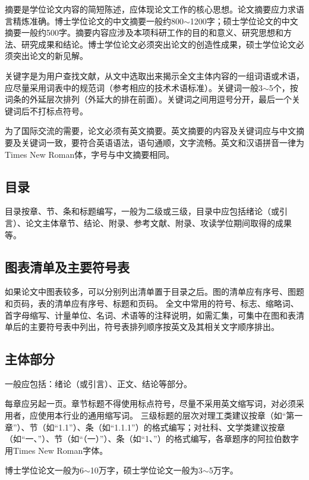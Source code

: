 摘要是学位论文内容的简短陈述，应体现论文工作的核心思想。论文摘要应力求语言精炼准确。博士学位论文的中文摘要一般约800$\sim$1200字；硕士学位论文的中文摘要一般约500字。摘要内容应涉及本项科研工作的目的和意义、研究思想和方法、研究成果和结论。博士学位论文必须突出论文的创造性成果，硕士学位论文必须突出论文的新见解。

关键字是为用户查找文献，从文中选取出来揭示全文主体内容的一组词语或术语，应尽量采用词表中的规范词（参考相应的技术术语标准）。关键词一般3$\sim$5个，按词条的外延层次排列（外延大的排在前面）。关键词之间用逗号分开，最后一个关键词后不打标点符号。

为了国际交流的需要，论文必须有英文摘要。英文摘要的内容及关键词应与中文摘要及关键词一致，要符合英语语法，语句通顺，文字流畅。英文和汉语拼音一律为Times New Roman体，字号与中文摘要相同。

\subsection{目录}

目录按章、节、条和标题编写，一般为二级或三级，目录中应包括绪论（或引言）、论文主体章节、结论、附录、参考文献、附录、攻读学位期间取得的成果等。

\subsection{图表清单及主要符号表}

如果论文中图表较多，可以分别列出清单置于目录之后。图的清单应有序号、图题和页码，表的清单应有序号、标题和页码。
全文中常用的符号、标志、缩略词、首字母缩写、计量单位、名词、术语等的注释说明，如需汇集，可集中在图和表清单后的主要符号表中列出，符号表排列顺序按英文及其相关文字顺序排出。

\subsection{主体部分}

一般应包括：绪论（或引言）、正文、结论等部分。

每章应另起一页。章节标题不得使用标点符号，尽量不采用英文缩写词，对必须采用者，应使用本行业的通用缩写词。
三级标题的层次对理工类建议按章（如“第一章”）、节（如“1.1”）、条（如“1.1.1”）的格式编写；对社科、文学类建议按章（如“一、”）、节（如“（一）”）、条（如“1、”）的格式编写，各章题序的阿拉伯数字用Times New Roman字体。

博士学位论文一般为6$\sim$10万字，硕士学位论文一般为3$\sim$5万字。

